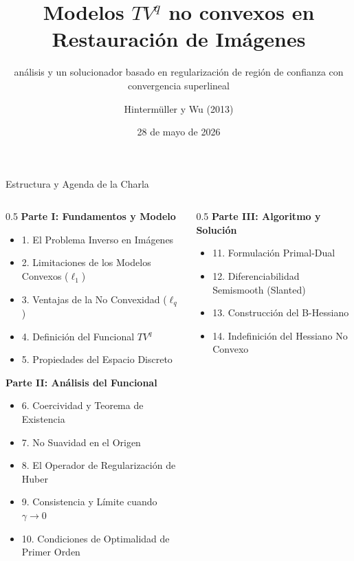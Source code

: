 \documentclass[aspectratio=169,11pt]{beamer}
\title{Modelos $TV^q$ no convexos en Restauración de Imágenes}
\subtitle{análisis y un solucionador basado en regularización de región de confianza con convergencia superlineal}
\author{Hintermüller y Wu (2013)}
\institute{MODEMAT}
\date{28 de mayo de 2026}
\begin{document}
\begin{frame}[plain]
    \titlepage
\end{frame}

\begin{frame}{Estructura y Agenda de la Charla}
    \begin{columns}[t]
        \begin{column}{0.5\textwidth}
            \small
            \textbf{Parte I: Fundamentos y Modelo}
            \begin{itemize}
                \item 1. El Problema Inverso en Imágenes
                \item 2. Limitaciones de los Modelos Convexos ($\ell_1$)
                \item 3. Ventajas de la No Convexidad ($\ell_q$)
                \item 4. Definición del Funcional $TV^q$
                \item 5. Propiedades del Espacio Discreto
            \end{itemize}
            \vspace{0.2cm}
            \textbf{Parte II: Análisis del Funcional}
            \begin{itemize}
                \item 6. Coercividad y Teorema de Existencia
                \item 7. No Suavidad en el Origen
                \item 8. El Operador de Regularización de Huber
                \item 9. Consistencia y Límite cuando $\gamma \to 0$
                \item 10. Condiciones de Optimalidad de Primer Orden
            \end{itemize}
        \end{column}
        \begin{column}{0.5\textwidth}
            \small
            \textbf{Parte III: Algoritmo y Solución}
            \begin{itemize}
                \item 11. Formulación Primal-Dual
                \item 12. Diferenciabilidad Semismooth (Slanted)
                \item 13. Construcción del B-Hessiano
                \item 14. Indefinición del Hessiano No Convexo

\end{itemize}
\end{column}
\end{columns}
\end{frame}
\end{document}
